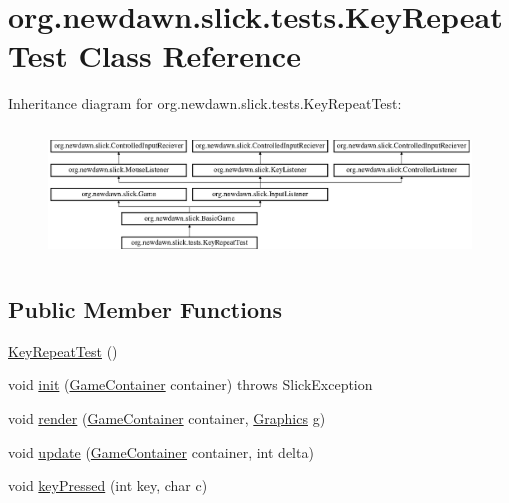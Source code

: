 \hypertarget{classorg_1_1newdawn_1_1slick_1_1tests_1_1_key_repeat_test}{}\section{org.\+newdawn.\+slick.\+tests.\+Key\+Repeat\+Test Class Reference}
\label{classorg_1_1newdawn_1_1slick_1_1tests_1_1_key_repeat_test}
Inheritance diagram for org.\+newdawn.\+slick.\+tests.\+Key\+Repeat\+Test\+:\begin{figure}[H]
\begin{center}
\leavevmode
\includegraphics[height=3.522012cm]{classorg_1_1newdawn_1_1slick_1_1tests_1_1_key_repeat_test}
\end{center}
\end{figure}
\subsection*{Public Member Functions}
\begin{DoxyCompactItemize}
\item 
\mbox{\hyperlink{classorg_1_1newdawn_1_1slick_1_1tests_1_1_key_repeat_test_afc09547e4d3e13751ea34732a0c23975}{Key\+Repeat\+Test}} ()
\item 
void \mbox{\hyperlink{classorg_1_1newdawn_1_1slick_1_1tests_1_1_key_repeat_test_a16457bc19cfcfd8d322b2fefc4e0799f}{init}} (\mbox{\hyperlink{classorg_1_1newdawn_1_1slick_1_1_game_container}{Game\+Container}} container)  throws Slick\+Exception 
\item 
void \mbox{\hyperlink{classorg_1_1newdawn_1_1slick_1_1tests_1_1_key_repeat_test_aaf889452510bb798a5827b2aad390dd1}{render}} (\mbox{\hyperlink{classorg_1_1newdawn_1_1slick_1_1_game_container}{Game\+Container}} container, \mbox{\hyperlink{classorg_1_1newdawn_1_1slick_1_1_graphics}{Graphics}} g)
\item 
void \mbox{\hyperlink{classorg_1_1newdawn_1_1slick_1_1tests_1_1_key_repeat_test_a4d6ab0932627780f42f23837e9e70527}{update}} (\mbox{\hyperlink{classorg_1_1newdawn_1_1slick_1_1_game_container}{Game\+Container}} container, int delta)
\item 
void \mbox{\hyperlink{classorg_1_1newdawn_1_1slick_1_1tests_1_1_key_repeat_test_ae19b26f365de8524b1e22a0f76bc8edd}{key\+Pressed}} (int key, char c)
\end{DoxyCompactItemize}
